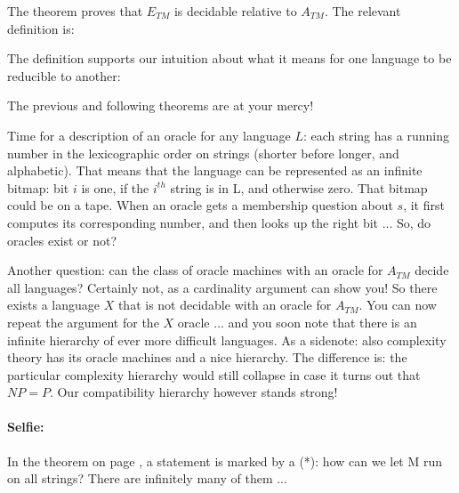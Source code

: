 The theorem proves that $E_{TM}$ is decidable relative to
$A_{TM}$. The relevant definition is:

The definition supports our intuition about what it means for one
language to be reducible to another:


The previous and following theorems are at your mercy!


Time for a description of an oracle for any language $L$: each
string has a running number in the lexicographic order on strings
(shorter before longer, and alphabetic). That means that the language
can be represented as an infinite bitmap: bit $i$ is one, if the
$i^{th}$ string is in L, and otherwise zero. That bitmap could be on a
tape. When an oracle gets a membership question about $s$, it first
computes its corresponding number, and then looks up the right bit
... So, do oracles exist or not?

Another question: can the class of oracle machines with an oracle for
$A_{TM}$ decide all languages? Certainly not, as a cardinality
argument can show you! So there exists a language $X$ that is not
decidable with an oracle for $A_{TM}$. You can now repeat the argument
for the $X$ oracle ... and you soon note that there is an infinite
hierarchy of ever more difficult languages. As a sidenote: also
complexity theory has its oracle machines and a nice hierarchy. The
difference is: the particular complexity hierarchy would still
collapse in case it turns out that $NP = P$. Our compatibility
hierarchy however stands strong!

\paragraph{Selfie:} In the theorem on page \pageref{allestrings}, 
a statement is marked by a (*): how can we let M run on all strings?
There are infinitely many of them ...




